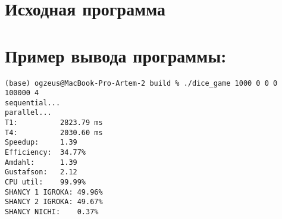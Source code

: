 \section{Исходная программа}

\begin{center}

\end{center}

\begin{center}

\end{center}

\begin{center}

\end{center}

\begin{center}

\end{center}

\section{Пример вывода программы:}
\begin{lstlisting}
(base) ogzeus@MacBook-Pro-Artem-2 build % ./dice_game 1000 0 0 0 100000 4
sequential...
parallel...
T1:          2823.79 ms
T4:          2030.60 ms
Speedup:     1.39
Efficiency:  34.77%
Amdahl:      1.39
Gustafson:   2.12
CPU util:    99.99%
SHANCY 1 IGROKA: 49.96%
SHANCY 2 IGROKA: 49.67%
SHANCY NICHI:    0.37%
\end{lstlisting}